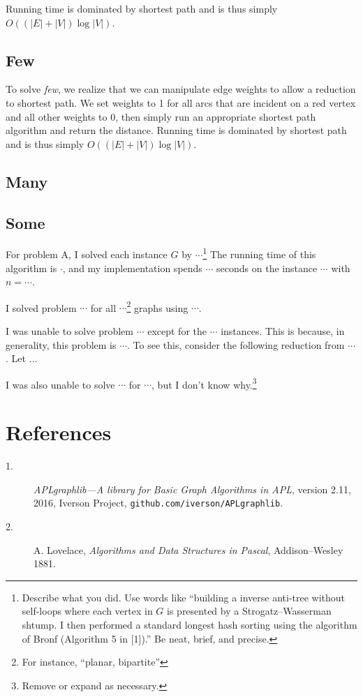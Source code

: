 \documentclass{tufte-handout}
\begin{document}
Running time is dominated by shortest path and is thus simply
$O((|E|+|V|) \log |V|)$.



\subsection{Few}
To solve \textit{few}, 
we realize that we can manipulate edge weights
to allow a reduction to shortest path.
We set weights to 1 for all arcs that 
are incident on a red vertex and all other weights to 0,
then simply run an appropriate shortest path algorithm 
and return the distance.
Running time is dominated by shortest path and is thus simply
$O((|E|+|V|) \log |V|)$.


\subsection{Many}
\subsection{Some}

For problem A, I solved each instance $G$ by $\cdots$\footnote{Describe what you did.
  Use words like ``building a inverse anti-tree without self-loops where each vertex in $G$ is presented by a Strogatz--Wasserman shtump.
  I then performed a standard longest hash sorting using the algorithm of Bronf (Algorithm 5 in [1]).''
  Be neat, brief, and precise.}
The running time of this algorithm is $\cdot$, and my implementation spends $\cdots$ seconds on the instance $\cdots$ with  $n=\cdots$.

I solved problem $\cdots$ for all $\cdots$\footnote{For instance, “planar, bipartite”} graphs using $\cdots$.

I was unable to solve problem $\cdots$ except for the $\cdots$ instances.
This is because, in generality, this problem is $\cdots$. 
To see this, consider the following reduction from $\cdots$.
Let $\ldots$ 

I was also unable to solve $\cdots$ for $\cdots$, but I don’t know why.\footnote{Remove or expand as necessary.}

\section{References}
\begin{description}
  \item[1.] \emph{APLgraphlib---A library for Basic Graph Algorithms in APL}, version 2.11, 2016, Iverson Project, {\tt github.com/iverson/APLgraphlib}.

  \item[2.] A. Lovelace, \emph{Algorithms and Data Structures in Pascal}, Addison--Wesley 1881. 
\end{description}
\end{document}
